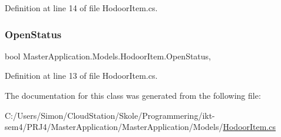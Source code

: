 Definition at line 14 of file Hodoor\+Item.\+cs.

\mbox{\label{class_master_application_1_1_models_1_1_hodoor_item_ad95169eb7989daf2c856ab4f56e455a4}} 
\subsubsection{\texorpdfstring{Open\+Status}{OpenStatus}}
{\footnotesize\ttfamily bool Master\+Application.\+Models.\+Hodoor\+Item.\+Open\+Status\hspace{0.3cm}{\ttfamily [get]}, {\ttfamily [set]}}



Definition at line 13 of file Hodoor\+Item.\+cs.



The documentation for this class was generated from the following file\+:\begin{DoxyCompactItemize}
\item 
C\+:/\+Users/\+Simon/\+Cloud\+Station/\+Skole/\+Programmering/ikt-\/sem4/\+P\+R\+J4/\+Master\+Application/\+Master\+Application/\+Models/\mbox{\hyperlink{_master_application_2_master_application_2_models_2_hodoor_item_8cs}{Hodoor\+Item.\+cs}}\end{DoxyCompactItemize}
